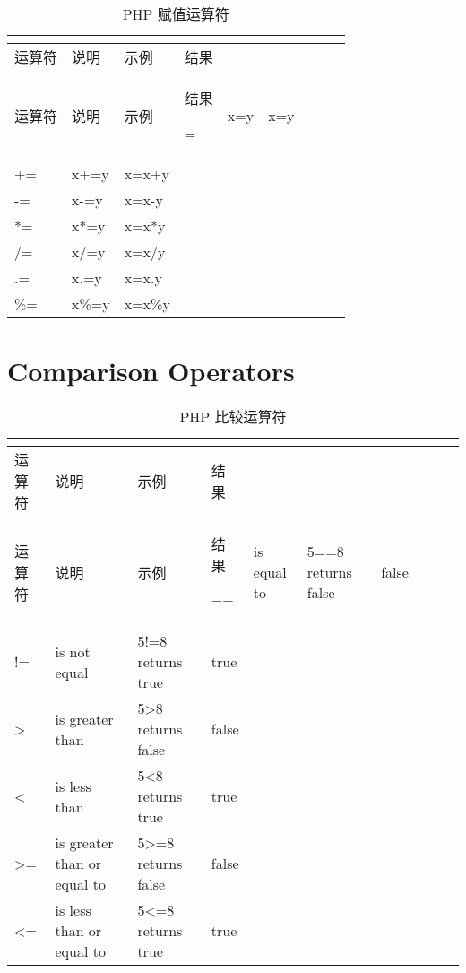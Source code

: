 \begin{longtable}{|m{35pt}|m{180pt}|m{80pt}|m{30pt}|}
\tabularnewline\hline
运算符	&说明	&示例	&结果
\endhead

\caption{PHP 赋值运算符}\\
\hline
运算符	&说明	&示例	&结果
\endfirsthead

\endfoot

\endlastfoot
\hline
=		&x=y		&x=y&\\
\hline
+\/=	&x+\/=y	&x=x+y&\\
\hline
-\/=		&x-\/=y		&x=x-y&\\
\hline
*\/=	&x*\/=y	&x=x*y&\\
\hline
/\/=		&x/\/=y		&x=x/y&\\
\hline
.\/=		&x.\/=y		&x=x.y&\\
\hline
\%\/=	&x\%\/=y	&x=x\%y&\\
\hline
\end{longtable}



\section{Comparison Operators}


\begin{longtable}{|m{35pt}|m{180pt}|m{80pt}|m{30pt}|}
\tabularnewline\hline
运算符	&说明	&示例	&结果
\endhead

\caption{PHP 比较运算符}\\
\hline
运算符	&说明	&示例	&结果
\endfirsthead

\endfoot

\endlastfoot
\hline
=\/=	&is equal to					&5==8 returns false&false\\
\hline
!\/=	&is not equal					&5!=8 returns true&true\\
\hline
>	&is greater than					&5>8 returns false&false\\
\hline
<	&is less than					&5<8 returns true&true\\
\hline
>\/=	&is greater than or equal to &5>=8 returns false&false\\
\hline
<\/=	&is less than or equal to	&5<=8 returns true&true\\
\hline

\end{longtable}


